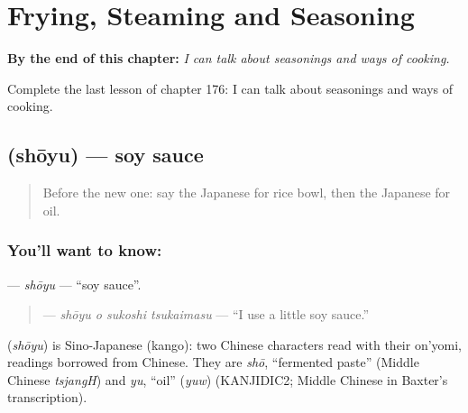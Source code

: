 
\chapter{Frying, Steaming and Seasoning}
\label{ch:ja-frying-steaming-and-seasoning}

\begin{chapteropening}
\textbf{By the end of this chapter:} \emph{I can talk about seasonings and ways of cooking.}

Complete the last lesson of chapter 176: I can talk about seasonings and ways of cooking.
\end{chapteropening}

\section[\texorpdfstring{\ja{しょうゆ} (shōyu)}{しょうゆ (shōyu)}]{ (shōyu) — soy sauce}

\label{lesson:JA-C176-shouyu}



\begin{quote}
Before the new one: say the Japanese for rice bowl, then the Japanese for oil.
\end{quote}

\subsection*{You'll want to know: }
\textbf{} — \emph{shōyu} — \textquotedblleft{}soy sauce\textquotedblright{}.

\begin{quote}
\textbf{  } — \emph{shōyu o sukoshi tsukaimasu} — \textquotedblleft{}I use a little soy sauce.\textquotedblright{}
\end{quote}

\begin{cousinweb}
\textbf{} (\emph{shōyu}) is Sino-Japanese (kango): two Chinese characters read with their on'yomi, readings borrowed from Chinese. They are \emph{shō}, \textquotedblleft{}fermented paste\textquotedblright{} (Middle Chinese \emph{tsjangH}) and \emph{yu}, \textquotedblleft{}oil\textquotedblright{} (\emph{yuw}) (KANJIDIC2; Middle Chinese in Baxter's transcription).
\end{cousinweb}


